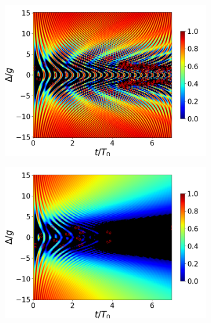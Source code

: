 \begin{figure}[H]
    \centering
    \begin{subfigure}{0.49\textwidth}
        \includegraphics[width=\textwidth]{figuras/ch4/concu/delta/eg1+ge1 k=0.0g x=0.0g J=0.0g gamma=0.25g concu delta uni.png}
        \caption{}
        \label{fig4:concu detunning 1 uni}
    \end{subfigure}
    \hfill
    \begin{subfigure}{0.49\textwidth}
        \includegraphics[width=\textwidth]{figuras/ch4/concu/delta/eg1+ge1 k=0.0g x=0.0g J=0.0g gamma=0.25g concu delta dis.png}
        \caption{}
        \label{fig4:concu detunning 1 dis}
    \end{subfigure}

\end{figure}
